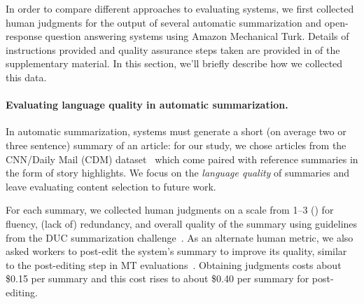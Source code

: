 In order to compare different approaches to evaluating systems, we first collected human judgments for the output of several automatic summarization and open-response question answering systems using Amazon Mechanical Turk.
Details of instructions provided and quality assurance steps taken are provided in  of the supplementary material.
In this section, we'll briefly describe how we collected this data.

\paragraph{Evaluating language quality in automatic summarization.}
In automatic summarization, systems must generate a short (on average two or three sentence) summary of an article: for our study, we chose articles from the CNN/Daily Mail (CDM) dataset~\citep{hermann2015read,nallapati2016abstractive} which come paired with reference summaries in the form of story highlights.
We focus on the \textit{language quality} of summaries and leave evaluating content selection to future work.

For each summary, we collected human judgments on a scale from 1--3 () for fluency, (lack of) redundancy, and overall quality of the summary using guidelines from the DUC summarization challenge~\citep{dang2006overview}.
As an alternate human metric, we also asked workers to post-edit the system's summary to improve its quality, similar to the post-editing step in MT evaluations~\citep{snover2006ter}.
Obtaining judgments costs about \$0.15 per summary and this cost rises to about \$0.40 per summary for post-editing.

